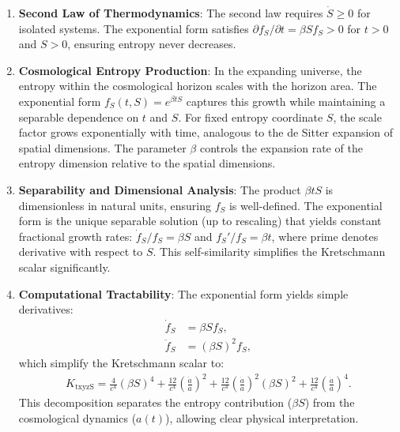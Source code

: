\documentclass[11pt,a4paper]{article}
\begin{document}
\begin{enumerate}
    \item \textbf{Second Law of Thermodynamics}: The second law requires 
          $\dot{S} \geq 0$ for isolated systems. The exponential form 
          satisfies $\partial f_S/\partial t = \beta S f_S > 0$ for 
          $t > 0$ and $S > 0$, ensuring entropy never decreases.

\item \textbf{Cosmological Entropy Production}: In the expanding universe, 
          the entropy within the cosmological horizon scales with the 
          horizon area. The exponential form $f_S(t,S) = e^{\beta t S}$ 
          captures this growth while maintaining a separable dependence 
          on $t$ and $S$. For fixed entropy coordinate $S$, the scale 
          factor grows exponentially with time, analogous to the de Sitter 
          expansion of spatial dimensions. The parameter $\beta$ controls 
          the expansion rate of the entropy dimension relative to the 
          spatial dimensions.

\item \textbf{Separability and Dimensional Analysis}: The product $\beta t S$ 
          is dimensionless in natural units, ensuring $f_S$ is well-defined. 
          The exponential form is the unique separable solution (up to 
          rescaling) that yields constant fractional growth rates:
          $\dot{f}_S/f_S = \beta S$ and $f_S'/f_S = \beta t$, where prime 
          denotes derivative with respect to $S$. This self-similarity 
          simplifies the Kretschmann scalar significantly.

    \item \textbf{Computational Tractability}: The exponential form yields 
          simple derivatives:
          \begin{align}
          \dot{f}_S &= \beta S f_S, \\
          \ddot{f}_S &= (\beta S)^2 f_S,
          \end{align}
          which simplify the Kretschmann scalar to:
          \begin{align}
          K_{\text{txyzS}} = \frac{4}{c^4}(\beta S)^4 
          + \frac{12}{c^4}\left(\frac{\ddot{a}}{a}\right)^2 
          + \frac{12}{c^4}\left(\frac{\dot{a}}{a}\right)^2 (\beta S)^2 
          + \frac{12}{c^4}\left(\frac{\dot{a}}{a}\right)^4.
          \end{align}
          This decomposition separates the entropy contribution ($\beta S$) 
          from the cosmological dynamics ($a(t)$), allowing clear physical 
          interpretation.


\end{enumerate}
\end{document}
